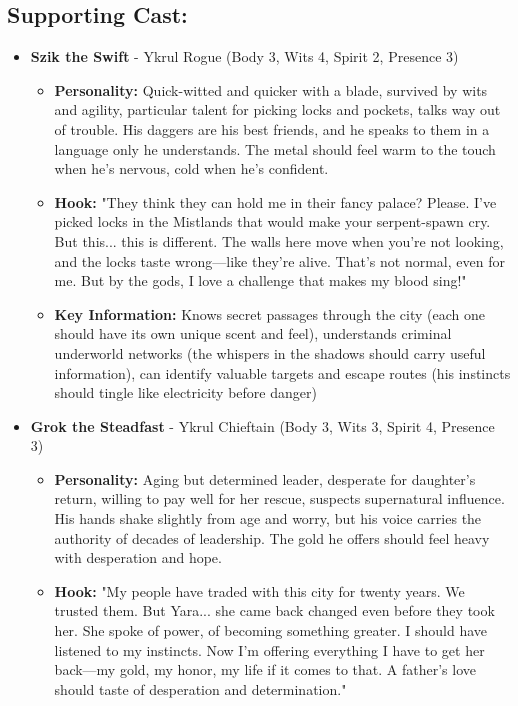 \documentclass[11pt]{article}
\begin{document}
\subsection{Supporting Cast:}
\begin{itemize}
\item \textbf{Szik the Swift} - Ykrul Rogue (Body 3, Wits 4, Spirit 2, Presence 3)
  \begin{itemize}
  \item \textbf{Personality:} Quick-witted and quicker with a blade, survived by wits and agility, particular talent for picking locks and pockets, talks way out of trouble. His daggers are his best friends, and he speaks to them in a language only he understands. The metal should feel warm to the touch when he's nervous, cold when he's confident.
  \item \textbf{Hook:} "They think they can hold me in their fancy palace? Please. I've picked locks in the Mistlands that would make your serpent-spawn cry. But this... this is different. The walls here move when you're not looking, and the locks taste wrong—like they're alive. That's not normal, even for me. But by the gods, I love a challenge that makes my blood sing!"
  \item \textbf{Key Information:} Knows secret passages through the city (each one should have its own unique scent and feel), understands criminal underworld networks (the whispers in the shadows should carry useful information), can identify valuable targets and escape routes (his instincts should tingle like electricity before danger)
  \end{itemize}
\item \textbf{Grok the Steadfast} - Ykrul Chieftain (Body 3, Wits 3, Spirit 4, Presence 3)
  \begin{itemize}
  \item \textbf{Personality:} Aging but determined leader, desperate for daughter's return, willing to pay well for her rescue, suspects supernatural influence. His hands shake slightly from age and worry, but his voice carries the authority of decades of leadership. The gold he offers should feel heavy with desperation and hope.
  \item \textbf{Hook:} "My people have traded with this city for twenty years. We trusted them. But Yara... she came back changed even before they took her. She spoke of power, of becoming something greater. I should have listened to my instincts. Now I'm offering everything I have to get her back—my gold, my honor, my life if it comes to that. A father's love should taste of desperation and determination."

\end{itemize}
\end{itemize}
\end{document}
